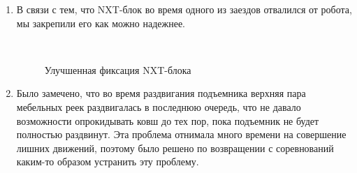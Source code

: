 \begin{enumerate}
	\item В связи с тем, что NXT-блок во время одного из заездов отвалился от робота, мы закрепили его как можно надежнее.
	
	\begin{figure}[H]
		\begin{minipage}[h]{0.2\linewidth}
			\center  
		\end{minipage}
		\begin{minipage}[h]{0.6\linewidth}
			\caption{Улучшенная фиксация NXT-блока}
		\end{minipage}
	\end{figure}
	
	\item Было замечено, что во время раздвигания подъемника верхняя пара мебельных реек раздвигалась в последнюю очередь, что не давало возможности опрокидывать ковш до тех пор, пока подъемник не будет полностью раздвинут. Эта проблема отнимала много времени на совершение лишних движений, поэтому было решено по возвращении с соревнований каким-то образом устранить эту проблему.
	
\end{enumerate}
\fillpage